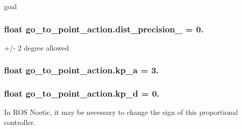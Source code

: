 goal 

\subsubsection[{\texorpdfstring{dist\+\_\+precision\+\_\+}{dist_precision_}}]{\setlength{\rightskip}{0pt plus 5cm}float go\+\_\+to\+\_\+point\+\_\+action.\+dist\+\_\+precision\+\_\+ = 0.}\hypertarget{namespacego__to__point__action_a2b67a832bde842bf565341c5fc606f81}{}\label{namespacego__to__point__action_a2b67a832bde842bf565341c5fc606f81}


+/-\/ 2 degree allowed 

\subsubsection[{\texorpdfstring{kp\+\_\+a}{kp_a}}]{\setlength{\rightskip}{0pt plus 5cm}float go\+\_\+to\+\_\+point\+\_\+action.\+kp\+\_\+a = 3.}\hypertarget{namespacego__to__point__action_a9f06acd5d2562909e122242d328755df}{}\label{namespacego__to__point__action_a9f06acd5d2562909e122242d328755df}
\subsubsection[{\texorpdfstring{kp\+\_\+d}{kp_d}}]{\setlength{\rightskip}{0pt plus 5cm}float go\+\_\+to\+\_\+point\+\_\+action.\+kp\+\_\+d = 0.}\hypertarget{namespacego__to__point__action_a34be7fb79cc4f03e9b8671df19275132}{}\label{namespacego__to__point__action_a34be7fb79cc4f03e9b8671df19275132}


In R\+OS Noetic, it may be necessary to change the sign of this proportional controller. 

